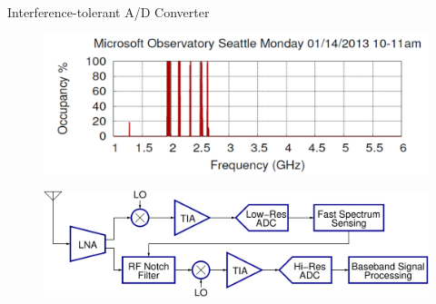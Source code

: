 \documentclass[10pt,xcolor=table]{beamer}
\begin{document}
	\begin{frame}{Interference-tolerant A/D Converter}
		
		
		\begin{figure}[t]
			\centering
			\includegraphics[width=3.5 in]{./Figures/spectrumsensing}
		\end{figure}
		\begin{figure}[t]
			\centering
			\includegraphics[width=3.5 in]{./Figures/systemdiagram}
		\end{figure}
	\end{frame}
\end{document}
